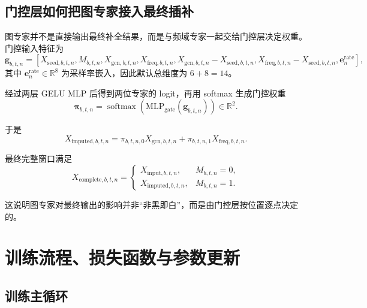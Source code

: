 \documentclass[UTF8]{ctexart}
\begin{document}
\subsection{门控层如何把图专家接入最终插补}

图专家并不是直接输出最终补全结果，而是与频域专家一起交给门控层决定权重。门控输入特征为
\begin{equation}
    \bm{g}_{b,t,n} =
    \left[
        X_{\text{seed},b,t,n},
        M_{b,t,n},
        X_{\text{gcn},b,t,n},
        X_{\text{freq},b,t,n},
        X_{\text{gcn},b,t,n} - X_{\text{seed},b,t,n},
        X_{\text{freq},b,t,n} - X_{\text{seed},b,t,n},
        \bm{e}^{\text{rate}}_{n}
    \right],
\end{equation}
其中 \(\bm{e}^{\text{rate}}_{n}\in\mathbb{R}^{8}\) 为采样率嵌入，因此默认总维度为 \(6+8=14\)。

经过两层 GELU MLP 后得到两位专家的 logit，再用 softmax 生成门控权重
\begin{equation}
    \bm{\pi}_{b,t,n} =
    \operatorname{softmax}\!\left(
        \text{MLP}_{\text{gate}}(\bm{g}_{b,t,n})
    \right)
    \in \mathbb{R}^{2}.
\end{equation}

于是
\begin{equation}
    X_{\text{imputed},b,t,n}
    =
    \pi_{b,t,n,0} X_{\text{gcn},b,t,n}
    +
    \pi_{b,t,n,1} X_{\text{freq},b,t,n}.
\end{equation}

最终完整窗口满足
\begin{equation}
    X_{\text{complete},b,t,n}
    =
    \begin{cases}
        X_{\text{input},b,t,n}, & M_{b,t,n}=0, \\
        X_{\text{imputed},b,t,n}, & M_{b,t,n}=1.
    \end{cases}
\end{equation}

这说明图专家对最终输出的影响并非“非黑即白”，而是由门控层按位置逐点决定的。

\section{训练流程、损失函数与参数更新}

\subsection{训练主循环}
\end{document}
